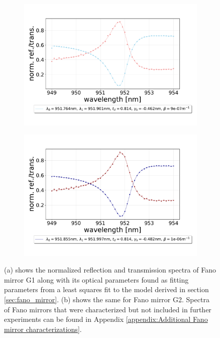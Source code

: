 \begin{figure}[h!]
    \centering
    \begin{subfigure}[b]{0.49\textwidth}
        \includegraphics[width=\textwidth]{figures/results/M3:M5/M5:G1_initial_spectrum.pdf}
        \caption{}
        \label{}
    \end{subfigure}
    \begin{subfigure}[b]{0.49\textwidth}
        \includegraphics[width=\textwidth]{figures/results/M3:M5/M3:G2_initial_spectrum.pdf}
        \caption{}
        \label{}
    \end{subfigure}
    \caption{(a) shows the normalized reflection and transmission spectra of Fano mirror G1 along with its optical parameters found as fitting parameters from a least squares fit to the model derived in section \ref{sec:fano_mirror}. (b) shows the same for Fano mirror G2. Spectra of Fano mirrors that were characterized but not included in further experiments can be found in Appendix \ref{appendix:Additional Fano mirror characterizations}.}
    \label{fig:individual_G1_and_G2_spectra}
\end{figure}

